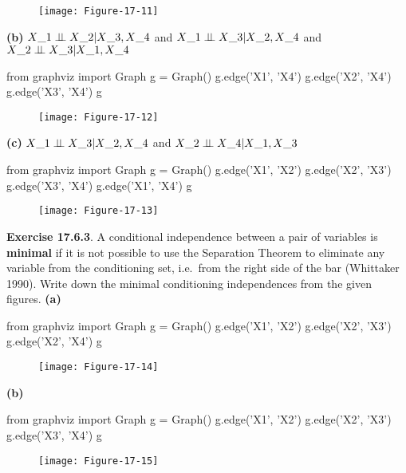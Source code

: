 \begin{figure}[H]
\centering
\texttt{[image: Figure-17-11]}
\end{figure}

\textbf{(b)} $X\_{1} \perp\!\!\!\perp X\_{2} | X\_{3}, X\_{4} $ and $X\_{1}
\perp\!\!\!\perp X\_{3} | X\_{2}, X\_{4} $ and $X\_{2} \perp\!\!\!\perp X\_{3}
| X\_{1}, X\_{4} $

\begin{python}
from graphviz import Graph
g = Graph()
g.edge('X1', 'X4')
g.edge('X2', 'X4')
g.edge('X3', 'X4')
g
\end{python}

\begin{figure}[H]
\centering
\texttt{[image: Figure-17-12]}
\end{figure}

\textbf{(c)} $X\_{1} \perp\!\!\!\perp X\_{3} | X\_{2}, X\_{4} $ and $X\_{2}
\perp\!\!\!\perp X\_{4} | X\_{1}, X\_{3} $

\begin{python}
from graphviz import Graph
g = Graph()
g.edge('X1', 'X2')
g.edge('X2', 'X3')
g.edge('X3', 'X4')
g.edge('X1', 'X4')
g
\end{python}

\begin{figure}[H]
\centering
\texttt{[image: Figure-17-13]}
\end{figure}


\textbf{Exercise 17.6.3}. A conditional independence between a pair of
variables is \textbf{minimal} if it is not possible to use the
Separation Theorem to eliminate any variable from the conditioning set,
i.e.~from the right side of the bar (Whittaker 1990). Write down the
minimal conditioning independences from the given figures.
\textbf{(a)}

\begin{python}
from graphviz import Graph
g = Graph()
g.edge('X1', 'X2')
g.edge('X2', 'X3')
g.edge('X2', 'X4')
g
\end{python}

\begin{figure}[H]
\centering
\texttt{[image: Figure-17-14]}
\end{figure}

\textbf{(b)}

\begin{python}
from graphviz import Graph
g = Graph()
g.edge('X1', 'X2')
g.edge('X2', 'X3')
g.edge('X3', 'X4')
g
\end{python}

\begin{figure}[H]
\centering
\texttt{[image: Figure-17-15]}
\end{figure}

